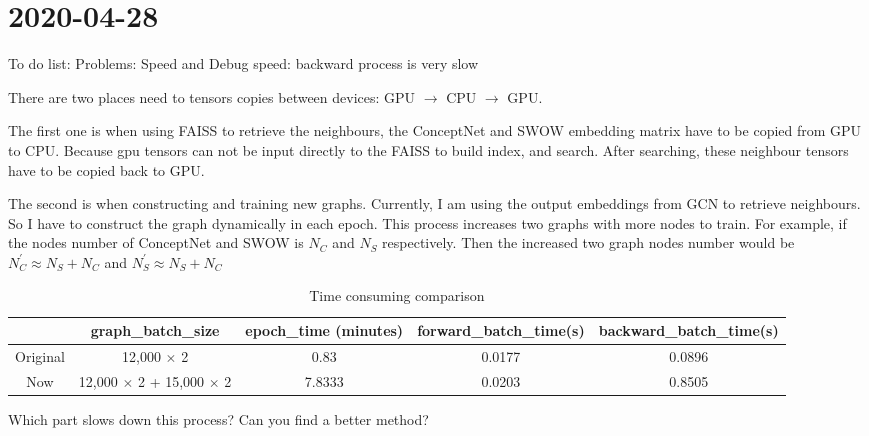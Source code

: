 
\chapter {2020-04-28}

%

To do list:
Problems: Speed and Debug
speed: backward process is very slow 

There are two places need to tensors copies between devices: GPU $\rightarrow$ CPU $\rightarrow $ GPU.  

The first one is when using FAISS to retrieve the neighbours, the ConceptNet and SWOW embedding matrix have to be copied from GPU to CPU. Because gpu tensors can not be input directly to the FAISS to build index, and search. After searching, these neighbour tensors have to be copied back to GPU.   

The second is when constructing and training new graphs. Currently, I am using the output embeddings from GCN to retrieve neighbours. So I have to construct the graph dynamically in each epoch. This process increases two graphs with more nodes to train. For example, if the nodes number of ConceptNet and SWOW is $N_C$ and $N_S$ respectively. Then the increased two graph nodes number would be $N_C^\prime \approx N_S + N_C $ and $N_S^\prime \approx N_S + N_C$

\begin{table}[!h]
    \centering
    \begin{adjustbox}{max width=\textwidth}
    \begin{tabular}{c|c|c|c|c}
    \hline
    & graph\_batch\_size & epoch\_time (minutes)  & forward\_batch\_time(s) & backward\_batch\_time(s) \\\hline
     Original & 12,000 $\times$ 2   & 0.83  & 0.0177 & 0.0896\\  \hline
     Now & 12,000 $\times$ 2 + 15,000 $\times$ 2  &  7.8333  & 0.0203 & 0.8505\\
     \hline
    \end{tabular}
    \end{adjustbox}
    \caption{Time consuming comparison}
    \label{tab:time-consume}
\end{table}


Which part slows down this process? Can you find a better method? 


